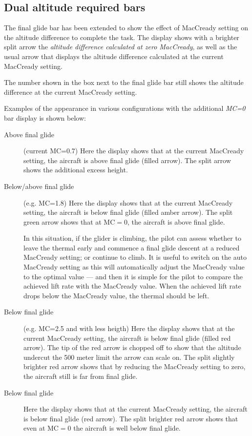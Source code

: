 \subsection*{Dual altitude required bars}

The final glide bar has been extended to show the effect of MacCready
setting on the altitude difference to complete the task.  The display
shows with a brighter split arrow the {\em altitude difference calculated at zero
MacCready}, as well as the usual arrow that displays the
altitude difference calculated at the current MacCready setting.

The number shown in the box next to the final glide bar still shows
the altitude difference at the current MacCready setting.

Examples of the appearance in various configurations with the additional {\em MC=0} 
bar display is shown below:

\begin{description}
\item[Above final glide] (current MC=0.7)
  Here the display shows that at the current MacCready setting, the aircraft
  is above final glide (filled arrow).  The split arrow shows the additional
  excess height.

\item[Below/above final glide] (e.g. MC=1.8)
  Here the display shows that at the current MacCready setting, the aircraft
  is below final glide (filled amber arrow).  The split green arrow
  shows that at MC$=0$, the aircraft is above final glide.

  In this situation, if the glider is climbing, the pilot can assess
  whether to leave the thermal early and commence a final glide
  descent at a reduced MacCready setting; or continue to climb.  It is
  useful to switch on the auto MacCready setting as this will
  automatically adjust the MacCready value to the optimal value ---
  and then it is simple for the pilot to compare the achieved lift
  rate with the MacCready value.  When the achieved lift rate drops
  below the MacCready value, the thermal should be left.

\item[Below final glide] (e.g. MC=2.5 and with less heigth)
  Here the display shows that at the current MacCready setting, the aircraft
  is below final glide (filled red arrow).  The tip of the red arrow is chopped off
  to show that the altitude undercut the 500 meter limit the arrow can scale on.
  The split slightly brighter red arrow shows that by reducing the MacCready 
  setting to zero, the aircraft still is far from final glide.

\item[Below final glide] 
  Here the display shows that at the current MacCready setting, the aircraft
  is below final glide (red arrow).  The split brighter red arrow
  shows that even at MC$=0$ the aircraft is well below final glide.
\end{description}


